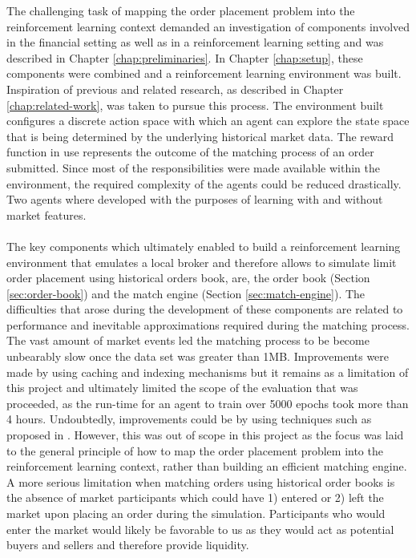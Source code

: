     The challenging task of mapping the order placement problem into the reinforcement learning context demanded an investigation of components involved in the financial setting as well as in a reinforcement learning setting and was described in Chapter \ref{chap:preliminaries}.
    In Chapter \ref{chap:setup}, these components were combined and a reinforcement learning environment was built.
    Inspiration of previous and related research, as described in Chapter \ref{chap:related-work}, was taken to pursue this process.
    The environment built configures a discrete action space with which an agent can explore the state space that is being determined by the underlying historical market data.
    The reward function in use represents the outcome of the matching process of an order submitted.
    Since most of the responsibilities were made available within the environment, the required complexity of the agents could be reduced drastically.
    Two agents where developed with the purposes of learning with and without market features.
    \\
    \\
    The key components which ultimately enabled to build a reinforcement learning environment that emulates a local broker and therefore allows to simulate limit order placement using historical orders book, are, the order book (Section \ref{sec:order-book}) and the match engine (Section \ref{sec:match-engine}).
    The difficulties that arose during the development of these components are related to performance and inevitable approximations required during the matching process.
    The vast amount of market events led the matching process to be become unbearably slow once the data set was greater than 1MB.
    Improvements were made by using caching and indexing mechanisms but it remains as a limitation of this project and ultimately limited the scope of the evaluation that was proceeded, as the run-time for an agent to train over 5000 epochs took more than 4 hours.
    Undoubtedly, improvements could be by using techniques such as proposed in \cite{barazzutti2016exploiting}.
    However, this was out of scope in this project as the focus was laid to the general principle of how to map the order placement problem into the reinforcement learning context, rather than building an efficient matching engine.
    A more serious limitation when matching orders using historical order books is the absence of market participants which could have 1) entered or 2) left the market upon placing an order during the simulation.
    Participants who would enter the market would likely be favorable to us as they would act as potential buyers and sellers and therefore provide liquidity.

